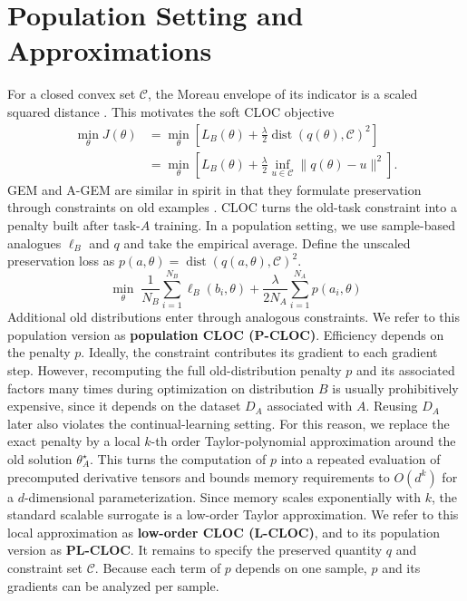 \section{Population Setting and Approximations}

For a closed convex set $\mathcal C$, the Moreau envelope of its indicator is a scaled squared distance \citep{MoreauProx}. This motivates the soft CLOC objective
\[
\begin{aligned}
\min_\theta J(\theta)
&=\min_\theta\left[
L_B(\theta)
+\frac{\lambda}{2}\operatorname{dist}(q(\theta),\mathcal C)^2
\right]\\
&=\min_\theta\left[
L_B(\theta)
+\frac{\lambda}{2}\inf_{u\in\mathcal C}\|q(\theta)-u\|^2
\right].
\end{aligned}
\]
GEM and A-GEM are similar in spirit in that they formulate preservation through constraints on old examples \citep{GEM,AGEM}. CLOC turns the old-task constraint into a penalty built after task-$A$ training. In a population setting, we use sample-based analogues $\ell_B$ and $q$ and take the empirical average. Define the unscaled preservation loss as $p(a,\theta)=\operatorname{dist}(q(a,\theta),\mathcal C)^2$.
\[
\min_\theta
\;
\frac{1}{N_B}\sum_{i=1}^{N_B}\ell_B(b_i,\theta)
+
\frac{\lambda}{2N_A}\sum_{i=1}^{N_A}p(a_i, \theta)
\]
Additional old distributions enter through analogous constraints. We refer to this population version as \textbf{population CLOC (P-CLOC)}. Efficiency depends on the penalty $p$. Ideally, the constraint contributes its gradient to each gradient step. However, recomputing the full old-distribution penalty $p$ and its associated factors many times during optimization on distribution $B$ is usually prohibitively expensive, since it depends on the dataset $D_A$ associated with $A$. Reusing $D_A$ later also violates the continual-learning setting. For this reason, we replace the exact penalty by a local $k$-th order Taylor-polynomial approximation around the old solution $\theta_A^\star$.
This turns the computation of $p$ into a repeated evaluation of precomputed derivative tensors and bounds memory requirements to $O(d^k)$ for a $d$-dimensional parameterization. Since memory scales exponentially with $k$, the standard scalable surrogate is a low-order Taylor approximation. We refer to this local approximation as \textbf{low-order CLOC (L-CLOC)}, and to its population version as \textbf{PL-CLOC}. It remains to specify the preserved quantity $q$ and constraint set $\mathcal{C}$. Because each term of $p$ depends on one sample, $p$ and its gradients can be analyzed per sample.

